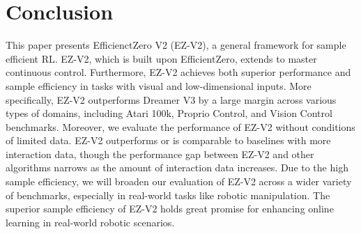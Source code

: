 \documentclass{article}
\theoremstyle{plain}
\theoremstyle{definition}
\theoremstyle{remark}
\begin{document}
\printAffiliationsAndNotice{\icmlEqualContribution} %














\section{Conclusion}
This paper presents EfficienctZero V2 (EZ-V2), a general framework for sample efficient RL. EZ-V2, which is built upon EfficientZero, extends to master continuous control. Furthermore, EZ-V2 achieves both superior performance and sample efficiency in tasks with visual and low-dimensional inputs. More specifically, EZ-V2 outperforms Dreamer V3 by a large margin across various types of domains, including Atari 100k, Proprio Control, and Vision Control benchmarks.  
Moreover, we evaluate the performance of EZ-V2 without conditions of limited data. EZ-V2 outperforms or is comparable to baselines with more interaction data, though the performance gap between EZ-V2 and other algorithms narrows as the amount of interaction data increases. 
Due to the high sample efficiency, we will broaden our evaluation of EZ-V2 across a wider variety of benchmarks, especially in real-world tasks like robotic manipulation. The superior sample efficiency of EZ-V2 holds great promise for enhancing online learning in real-world robotic scenarios. 







\end{document}
